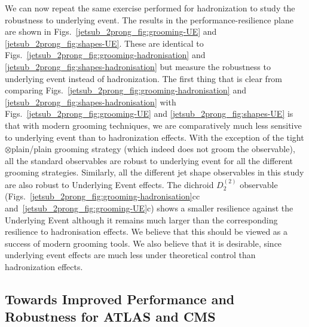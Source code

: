 \documentclass[11pt]{cernrep}
\begin{document}
We can now repeat the same exercise performed for hadronization to study the robustness to underlying event.
%
The results in the performance-resilience plane are shown in Figs.~\ref{jetsub_2prong_fig:grooming-UE} and \ref{jetsub_2prong_fig:shapes-UE}.
%
These are identical to Figs.~\ref{jetsub_2prong_fig:grooming-hadronisation} and \ref{jetsub_2prong_fig:shapes-hadronisation} but measure the robustness to underlying event instead of hadronization.
%
The first thing that is clear from comparing Figs.~\ref{jetsub_2prong_fig:grooming-hadronisation} and \ref{jetsub_2prong_fig:shapes-hadronisation} with  Figs.~\ref{jetsub_2prong_fig:grooming-UE} and \ref{jetsub_2prong_fig:shapes-UE} is that with modern grooming techniques, we are comparatively much less sensitive to underlying event than to hadronization effects.
%
With the exception of the tight$\otimes$plain/plain grooming strategy
(which indeed does not groom the observable), all the standard
observables are robust to underlying event for all the different
grooming strategies. Similarly, all the different jet shape
observables in this study are also robust to Underlying Event
effects. The dichroid $D_2^{(2)}$ observable
(Figs.~\ref{jetsub_2prong_fig:grooming-hadronisation}cc
and~\ref{jetsub_2prong_fig:grooming-UE}c) shows a smaller resilience
against the Underlying Event although it remains much larger than the
corresponding resilience to hadronisation effects.
%
%
We believe that this should be viewed as a success of modern grooming tools.
%
We also believe that it is desirable, since underlying event effects are much less under theoretical control than hadronization effects. 




\subsection{Towards Improved Performance and Robustness for ATLAS and CMS}\label{jetsub_2prong_sec:exp_compare}
\end{document}
